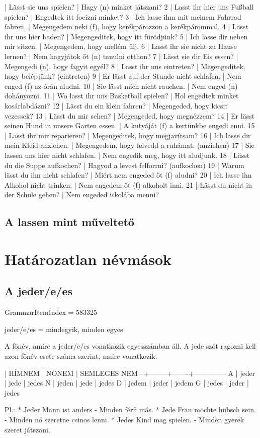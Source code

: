 \documentclass{article}
\newenvironment{desc}{\verbatim}{\endverbatim}
\newenvironment{exmp}{\verbatim}{\endverbatim}
\begin{document}
\begin{exmp}
1 | Lässt sie uns spielen? | Hagy (n) minket játszani?
2 | Lasst ihr hier uns Fußball spielen? | Engedtek itt focizni minket?
3 | Ich lasse ihm mit meinem Fahrrad fahren. | Megengedem neki (f), hogy kerékpározzon a kerékpárommal.
4 | Lasst ihr uns hier baden? | Megengeditek, hogy itt fürödjünk?
5 | Ich lasse dir neben mir sitzen. | Megengedem, hogy mellém ülj.
6 | Lasst ihr sie nicht zu Hause lernen? | Nem hagyjátok őt (n) tanulni otthon?
7 | Lässt sie dir Eis essen? | Megengedi (n), hogy fagyit egyél?
8 | Lasst ihr uns eintreten? | Megengeditek, hogy belépjünk? (eintreten)
9 | Er lässt auf der Stunde nicht schlafen. | Nem enged (f) az órán aludni.
10 | Sie lässt mich nicht rauchen. | Nem enged (n) dohányozni.
11 | Wo lasst ihr uns Basketball spielen? | Hol engedtek minket kosárlabdázni?
12 | Lässt du ein klein fahren? | Megengeded, hogy kicsit vezessek?
13 | Lässt du mir sehen? | Megengeded, hogy megnézzem?
14 | Er lässt seinen Hund in unsere Garten essen. | A kutyáját (f) a kertünkbe engedi enni.
15 | Lasst ihr mir reparieren? | Megengeditek, hogy megjavítsam?
16 | Ich lasse dir mein Kleid anziehen. | Megengedem, hogy felvedd a ruhámat. (anziehen)
17 | Sie lassen uns hier nicht schlafen. | Nem engedik meg, hogy itt aludjunk.
18 | Lässt du die Suppe aufkochen? | Hagyod a levest felforrni? (aufkochen)
19 | Warum lässt du ihn nicht schlafen? | Miért nem engeded őt (f) aludni?
20 | Ich lasse ihn Alkohol nicht trinken. | Nem engedem őt (f) alkoholt inni.
21 | Lässt du nicht in der Schule gehen? | Nem engeded iskolába menni?
\end{exmp}

\subsection{A lassen mint műveltető}

\section{Határozatlan névmások}

\subsection{A jeder/e/es}

GrammarItemIndex = 583325

\begin{desc}
jeder/e/es = mindegyik, minden egyes

A főnév, amire a jeder/e/es vonatkozik egyesszámban áll. A jede szót ragozni kell azon főnév esete száma szerint, amire vonatkozik.

  | HÍMNEM | NŐNEM | SEMLEGES NEM
--+--------+-------+--------------
A | jeder  | jede  | jedes
N | jeden  | jede  | jedes
D | jedem  | jeder | jedem
G | jedes  | jeder | jedes

Pl.: * Jeder Mann ist anders - Minden férfi más.
* Jede Frau möchte hübsch sein. - Minden nő szeretne csinos lenni.
* Jedes Kind mag spielen. - Minden gyerek szeret játszani.
\end{desc}
\end{document}
